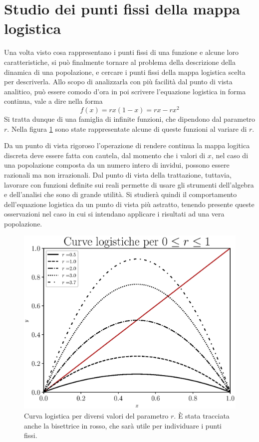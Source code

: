 \section{Studio dei punti fissi della mappa logistica}
Una volta visto cosa rappresentano i punti fissi di una funzione e alcune loro caratteristiche, si può finalmente tornare al problema della descrizione della dinamica di una popolazione, e cercare i punti fissi della mappa logistica scelta per descriverla. Allo scopo di analizzarla con più facilità dal punto di vista analitico, può essere comodo d'ora in poi scrivere l'equazione logistica in forma continua, vale a dire nella forma
\begin{equation}
    f(x) = rx(1-x) = rx - rx^2
    \label{eq:logistica_continua}
\end{equation}
Si tratta dunque di una famiglia di infinite funzioni, che dipendono dal parametro $r$. Nella figura \ref{fig:logistiche} sono state rappresentate alcune di queste funzioni al variare di $r$.

Da un punto di vista rigoroso l'operazione di rendere continua la mappa logitica discreta deve essere fatta con cautela, dal momento che i valori di $x$, nel caso di una popolazione composta da un numero intero di invidui, possono essere razionali ma non irrazionali. Dal punto di vista della trattazione, tuttavia, lavorare con funzioni definite sui reali permette di usare gli strumenti dell'algebra e dell'analisi che sono di grande utilità. Si studierà quindi il comportamento dell'equazione logistica da un punto di vista più astratto, tenendo presente queste osservazioni nel caso in cui si intendano applicare i risultati ad una vera popolazione.\\
\begin{figure}[h!]
    \begin{center}
    \includegraphics[scale=0.65]{Immagini/curve_logistiche.eps}
    \captionsetup{width=.8\linewidth}
    \caption{Curva logistica per diversi valori del parametro $r$. È stata tracciata anche la bisettrice in rosso, che sarà utile per individuare i punti fissi.}
    \label{fig:logistiche}
    \end{center}
\end{figure}

